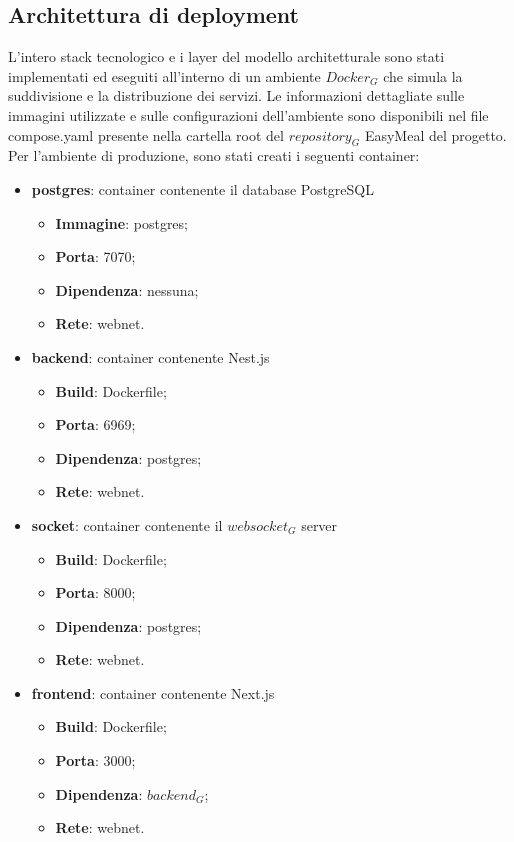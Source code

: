 \subsection{Architettura di deployment}
L'intero stack tecnologico e i layer del modello architetturale sono stati implementati ed eseguiti all'interno di un ambiente $\textit{Docker}_G$ che simula la suddivisione e la distribuzione dei servizi. Le informazioni dettagliate sulle immagini utilizzate e sulle configurazioni dell'ambiente sono disponibili nel file compose.yaml presente nella cartella root del $\textit{repository}_G$ EasyMeal del progetto.\\
Per l'ambiente di produzione, sono stati creati i seguenti container:
\begin{itemize}
    \item \textbf{postgres}: container contenente il database PostgreSQL
    \begin{itemize}
        \item \textbf{Immagine}: postgres;
        \item \textbf{Porta}: 7070;
        \item \textbf{Dipendenza}: nessuna;
        \item \textbf{Rete}: webnet.
    \end{itemize}
    \item \textbf{backend}: container contenente Nest.js
    \begin{itemize}
        \item \textbf{Build}: Dockerfile;
        \item \textbf{Porta}: 6969;
        \item \textbf{Dipendenza}: postgres;
        \item \textbf{Rete}: webnet.
    \end{itemize}
    \item \textbf{socket}: container contenente il $\textit{websocket}_G$ server
     \begin{itemize}
        \item \textbf{Build}: Dockerfile;
        \item \textbf{Porta}: 8000;
        \item \textbf{Dipendenza}: postgres;
        \item \textbf{Rete}: webnet.
    \end{itemize}
    \item \textbf{frontend}: container contenente Next.js
     \begin{itemize}
        \item \textbf{Build}: Dockerfile;
        \item \textbf{Porta}: 3000;
        \item \textbf{Dipendenza}: $\textit{backend}_G$;
        \item \textbf{Rete}: webnet.
    \end{itemize}
\end{itemize}
